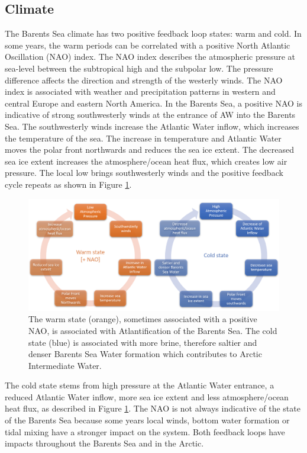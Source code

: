 \documentclass[a4paper, 12pt, Ariel]{article}
\begin{document}
\subsection{Climate}
The Barents Sea climate has two positive feedback loop states: warm and cold. In some years, the warm periods can be correlated with a positive North Atlantic Oscillation (NAO) index. The NAO index describes the atmospheric pressure at sea-level between the subtropical high and the subpolar low. The pressure difference affects the direction and strength of the westerly winds. The NAO index is associated with weather and precipitation patterns in western and central Europe and eastern North America. In the Barents Sea, a positive NAO is indicative of strong southwesterly winds at the entrance of AW into the Barents Sea. The southwesterly winds increase the Atlantic Water inflow, which increases the temperature of the sea. The increase in temperature and Atlantic Water moves the polar front northwards and reduces the sea ice extent. The decreased sea ice extent increases the atmosphere/ocean heat flux, which creates low air pressure. The local low brings southwesterly winds and the positive feedback cycle repeats as shown in Figure \ref{fig:feedback}.\\

\begin{figure}[H]
	\includegraphics[width=\textwidth]{BSfeedbackloops.png}
	\caption{The warm state (orange), sometimes associated with a positive NAO, is associated with Atlantification of the Barents Sea. The cold state (blue) is associated with more brine, therefore saltier and denser Barents Sea Water formation which contributes to Arctic Intermediate Water.}
	\label{fig:feedback}
\end{figure}


The cold state stems from high pressure at the Atlantic Water entrance, a reduced Atlantic Water inflow, more sea ice extent and less atmosphere/ocean heat flux, as described in Figure \ref{fig:feedback}. The NAO is not always indicative of the state of the Barents Sea because some years local winds, bottom water formation or tidal mixing have a stronger impact on the system. Both feedback loops have impacts throughout the Barents Sea and in the Arctic.\\
\end{document}
